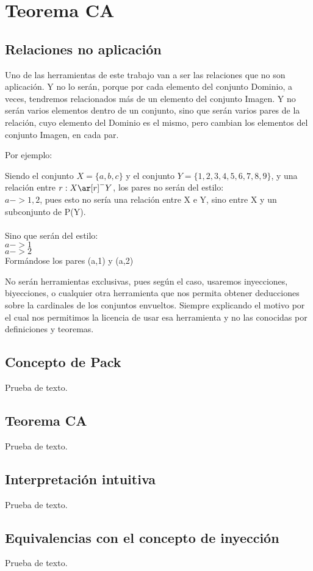 \chapter{Teorema CA}

\newpage
\section{Relaciones no aplicación}
Uno de las herramientas de este trabajo van a ser las relaciones que no son aplicación. Y no lo serán, porque por cada elemento del conjunto Dominio, a veces, tendremos relacionados más de un elemento del conjunto Imagen. Y no serán varios elementos dentro de un conjunto, sino que serán varios pares de la relación, cuyo elemento del Dominio es el mismo, pero cambian los elementos del conjunto Imagen, en cada par.

Por ejemplo:

Siendo el conjunto $X=\{a,b,c\}$ y el conjunto $Y=\{1,2,3,4,5,6,7,8,9\}$, y una relación entre $r:X \ar[r]^-{} Y$, los pares no serán del estilo:\\
$a -> {1,2}$, pues esto no sería una relación entre X e Y, sino entre X y un subconjunto de P(Y).\\\\

\noindent Sino que serán del estilo:\\
$a-> 1$\\
$a-> 2$\\

Formándose los pares (a,1) y (a,2)

No serán herramientas exclusivas, pues según el caso, usaremos inyecciones, biyecciones, o cualquier otra herramienta que nos permita obtener deducciones sobre la cardinales de los conjuntos envueltos. Siempre explicando el motivo por el cual nos permitimos la licencia de usar esa herramienta y no las conocidas por definiciones y teoremas. 

\newpage
\section{Concepto de Pack}
Prueba de texto.

\newpage
\section{Teorema CA}
Prueba de texto.

\newpage
\section{Interpretación intuitiva}
Prueba de texto.

\newpage
\section{Equivalencias con el concepto de inyección}
Prueba de texto.